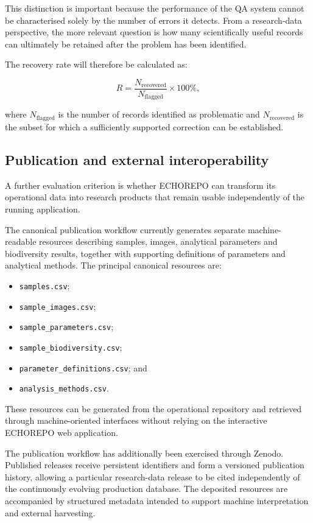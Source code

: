 This distinction is important because the performance of the QA system
cannot be characterised solely by the number of errors it detects. From
a research-data perspective, the more relevant question is how many
scientifically useful records can ultimately be retained after the
problem has been identified.

The recovery rate will therefore be calculated as:

\begin{equation}
    R =
    \frac{N_{\mathrm{recovered}}}
         {N_{\mathrm{flagged}}}
    \times 100\%,
\end{equation}

where $N_{\mathrm{flagged}}$ is the number of records identified as
problematic and $N_{\mathrm{recovered}}$ is the subset for which a
sufficiently supported correction can be established.

\subsection{Publication and external interoperability}

A further evaluation criterion is whether ECHOREPO can transform its
operational data into research products that remain usable independently
of the running application.

The canonical publication workflow currently generates separate
machine-readable resources describing samples, images, analytical
parameters and biodiversity results, together with supporting definitions
of parameters and analytical methods. The principal canonical resources
are:

\begin{itemize}
    \item \texttt{samples.csv};
    \item \texttt{sample\_images.csv};
    \item \texttt{sample\_parameters.csv};
    \item \texttt{sample\_biodiversity.csv};
    \item \texttt{parameter\_definitions.csv}; and
    \item \texttt{analysis\_methods.csv}.
\end{itemize}

These resources can be generated from the operational repository and
retrieved through machine-oriented interfaces without relying on the
interactive ECHOREPO web application.

The publication workflow has additionally been exercised through Zenodo.
Published releases receive persistent identifiers and form a versioned
publication history, allowing a particular research-data release to be
cited independently of the continuously evolving production database.
The deposited resources are accompanied by structured metadata intended
to support machine interpretation and external harvesting.

